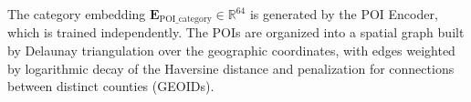 The category embedding $\mathbf{E}_{\text{POI\_category}} \in \mathbb{R}^{64}$ is generated by the POI Encoder, which is trained independently. The POIs are organized into a spatial graph
built by Delaunay triangulation over the geographic coordinates, with edges weighted by
logarithmic decay of the Haversine distance and penalization for connections between distinct
counties (GEOIDs).


